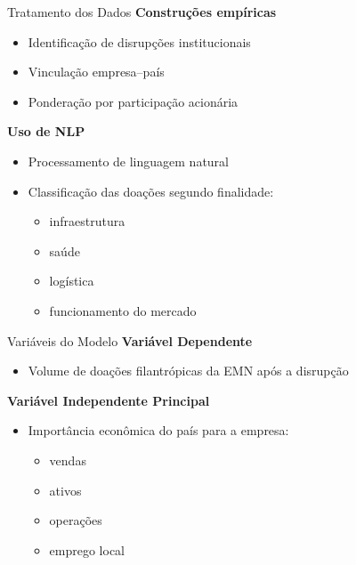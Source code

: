\documentclass[
  10pt,
  ignorenonframetext,
  aspectratio=169,
  brazilian,
]{beamer}
\providecommand{\tightlist}{%
  \setlength{\itemsep}{0pt}\setlength{\parskip}{0pt}}
\begin{document}
\begin{frame}{Tratamento dos Dados}
\label{tratamento-dos-dados}
\textbf{Construções empíricas}

\begin{itemize}
\tightlist
\item
  Identificação de disrupções institucionais
\item
  Vinculação empresa--país
\item
  Ponderação por participação acionária
\end{itemize}

\textbf{Uso de NLP}

\begin{itemize}
\tightlist
\item
  Processamento de linguagem natural
\item
  Classificação das doações segundo finalidade:

  \begin{itemize}
  \tightlist
  \item
    infraestrutura
  \item
    saúde
  \item
    logística
  \item
    funcionamento do mercado
  \end{itemize}
\end{itemize}
\end{frame}

\begin{frame}{Variáveis do Modelo}
\label{variuxe1veis-do-modelo}
\textbf{Variável Dependente}

\begin{itemize}
\tightlist
\item
  Volume de doações filantrópicas da EMN após a disrupção
\end{itemize}

\textbf{Variável Independente Principal}

\begin{itemize}
\tightlist
\item
  Importância econômica do país para a empresa:

  \begin{itemize}
  \tightlist
  \item
    vendas
  \item
    ativos
  \item
    operações
  \item
    emprego local
  \end{itemize}
\end{itemize}
\end{frame}
\end{document}
